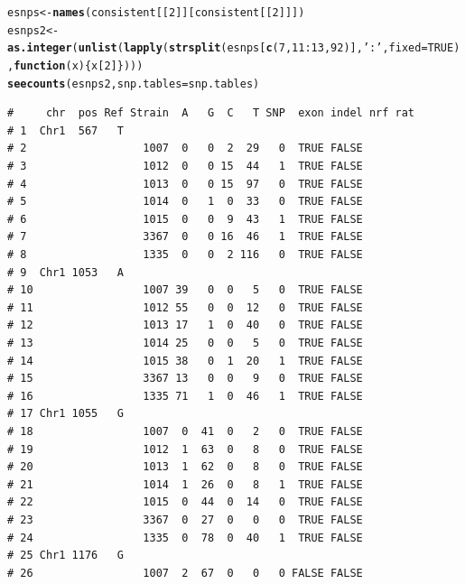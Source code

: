 \documentclass{article}\usepackage[]{graphicx}\usepackage[]{color}
\makeatletter
\newcommand{\hlnum}[1]{\textcolor[rgb]{0.686,0.059,0.569}{#1}}%
\newcommand{\hlstr}[1]{\textcolor[rgb]{0.192,0.494,0.8}{#1}}%
\newcommand{\hlopt}[1]{\textcolor[rgb]{0,0,0}{#1}}%
\newcommand{\hlstd}[1]{\textcolor[rgb]{0.345,0.345,0.345}{#1}}%
\newcommand{\hlkwa}[1]{\textcolor[rgb]{0.161,0.373,0.58}{\textbf{#1}}}%
\newcommand{\hlkwb}[1]{\textcolor[rgb]{0.69,0.353,0.396}{#1}}%
\newcommand{\hlkwc}[1]{\textcolor[rgb]{0.333,0.667,0.333}{#1}}%
\newcommand{\hlkwd}[1]{\textcolor[rgb]{0.737,0.353,0.396}{\textbf{#1}}}%
\newenvironment{kframe}{%
 \def\at@end@of@kframe{}%
 \ifinner\ifhmode%
  \def\at@end@of@kframe{\end{minipage}}%
  \begin{minipage}{\columnwidth}%
 \fi\fi%
 \def\FrameCommand##1{\hskip\@totalleftmargin \hskip-\fboxsep
 \colorbox{shadecolor}{##1}\hskip-\fboxsep
     \hskip-\linewidth \hskip-\@totalleftmargin \hskip\columnwidth}%
 \MakeFramed {\advance\hsize-\width
   \@totalleftmargin\z@ \linewidth\hsize
   \@setminipage}}%
 {\par\unskip\endMakeFramed%
 \at@end@of@kframe}
\newenvironment{knitrout}{}{} %
\makeatother
\begin{document}
\begin{knitrout}\footnotesize
{}\color{fgcolor}\begin{kframe}
\begin{alltt}
\hlstd{esnps} \hlkwb{<-} \hlkwd{names}\hlstd{(consistent[[}\hlnum{2}\hlstd{]][consistent[[}\hlnum{2}\hlstd{]]])}
\hlstd{esnps2} \hlkwb{<-} \hlkwd{as.integer}\hlstd{(}\hlkwd{unlist}\hlstd{(}\hlkwd{lapply}\hlstd{(}\hlkwd{strsplit}\hlstd{(esnps[}\hlkwd{c}\hlstd{(}\hlnum{7}\hlstd{,}\hlnum{11}\hlopt{:}\hlnum{13}\hlstd{,}\hlnum{92}\hlstd{)],}\hlstr{':'}\hlstd{,}\hlkwc{fixed}\hlstd{=}\hlnum{TRUE}\hlstd{),}\hlkwa{function}\hlstd{(}\hlkwc{x}\hlstd{)\{x[}\hlnum{2}\hlstd{]\})))}
\hlkwd{seecounts}\hlstd{(esnps2,}\hlkwc{snp.tables}\hlstd{=snp.tables)}
\end{alltt}
\begin{verbatim}
#     chr  pos Ref Strain  A   G  C   T SNP  exon indel nrf rat
# 1  Chr1  567   T                                             
# 2                  1007  0   0  2  29   0  TRUE FALSE        
# 3                  1012  0   0 15  44   1  TRUE FALSE        
# 4                  1013  0   0 15  97   0  TRUE FALSE        
# 5                  1014  0   1  0  33   0  TRUE FALSE        
# 6                  1015  0   0  9  43   1  TRUE FALSE        
# 7                  3367  0   0 16  46   1  TRUE FALSE        
# 8                  1335  0   0  2 116   0  TRUE FALSE        
# 9  Chr1 1053   A                                             
# 10                 1007 39   0  0   5   0  TRUE FALSE        
# 11                 1012 55   0  0  12   0  TRUE FALSE        
# 12                 1013 17   1  0  40   0  TRUE FALSE        
# 13                 1014 25   0  0   5   0  TRUE FALSE        
# 14                 1015 38   0  1  20   1  TRUE FALSE        
# 15                 3367 13   0  0   9   0  TRUE FALSE        
# 16                 1335 71   1  0  46   1  TRUE FALSE        
# 17 Chr1 1055   G                                             
# 18                 1007  0  41  0   2   0  TRUE FALSE        
# 19                 1012  1  63  0   8   0  TRUE FALSE        
# 20                 1013  1  62  0   8   0  TRUE FALSE        
# 21                 1014  1  26  0   8   1  TRUE FALSE        
# 22                 1015  0  44  0  14   0  TRUE FALSE        
# 23                 3367  0  27  0   0   0  TRUE FALSE        
# 24                 1335  0  78  0  40   1  TRUE FALSE        
# 25 Chr1 1176   G                                             
# 26                 1007  2  67  0   0   0 FALSE FALSE        

\end{verbatim}
\end{kframe}
\end{knitrout}
\end{document}

